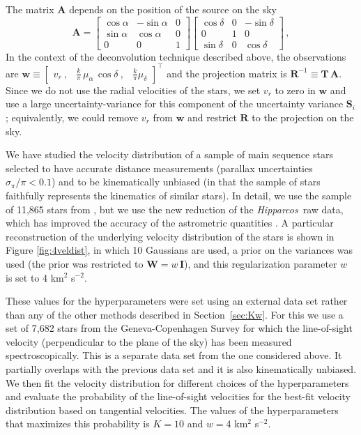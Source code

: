 \documentclass[aoas,preprint,authoryear,round]{imsart}
\newcommand{\Hipparcos}{\emph{Hipparcos}}
\renewcommand{\vec}[1]{\mathbf{#1}} %
\newcommand{\ww}{\vec{w}}
\newcommand{\ten}[1]{\mathbf{#1}} %
\newcommand{\RR}{\ten{R}}
\renewcommand{\SS}{\ten{S}}
\newcommand{\TT}{\ten{T}}
\newcommand{\WW}{\ten{W}}
\newcommand{\II}{\ten{I}}
\newcommand{\SSi}{\SS_i}
\newcommand{\T}{^{\scriptscriptstyle \top}}   %
\newcommand{\matrixleft}{\left[}
\newcommand{\matrixright}{\right]}
\newcommand{\parallax}{\ensuremath{\pi}}
\newcommand{\vrr}{\ensuremath{v_r}}
\newcommand{\ra}{\ensuremath{\alpha}}
\newcommand{\dec}{\ensuremath{\delta}}
\newcommand{\pmra}{\ensuremath{\mu_{\ra}}}
\newcommand{\pmdec}{\ensuremath{\mu_{\dec}}}
\newcommand{\AAA}{\ten{A}}
\begin{document}
The matrix $\AAA$ depends on the position of the source on the sky
\begin{equation}
\AAA = \matrixleft \begin{array}{ccc} \cos \ra & -\sin \ra & 0 \\ \sin \ra & \cos \ra & 0 \\ 0 & 0& 1 \end{array} \matrixright
\matrixleft \begin{array}{ccc} \cos \dec & 0 & -\sin \dec\\ 0 & 1 & 0 \\ \sin \dec  & 0 & \cos\dec\end{array} \matrixright\, ,
\end{equation}
In the context of the deconvolution technique described above, the
observations are $\ww \equiv \matrixleft\begin{array}{ccc} \vrr\ , &
\frac{k}{\parallax}\,\pmra\,\cos\dec\ ,&\frac{k}{\parallax}\pmdec\end{array}
\matrixright\T$ and the projection matrix is $\RR^{-1} \equiv
\TT\,\AAA$. Since we do not use the radial velocities of the stars, we
set $\vrr$ to zero in $\ww$ and use a large uncertainty-variance for
this component of the uncertainty variance $\SSi$; equivalently, we
could remove $\vrr$ from $\ww$ and restrict $\RR$ to the projection on
the sky.

We have studied the velocity distribution of a sample of main sequence
stars selected to have accurate distance measurements (parallax
uncertainties $\sigma_\pi/\pi < 0.1$) and to be kinematically unbiased
(in that the sample of stars faithfully represents the kinematics of
similar stars). In detail, we use the sample of 11,865 stars from
\citet{1998MNRAS.298..387D}, but we use the new reduction of the
\Hipparcos\ raw data, which has improved the accuracy of the
astrometric quantities
\citep{2007A&A...474..653V,2007ASSL..250.....V}. A particular
reconstruction of the underlying velocity distribution of the stars is
shown in Figure \ref{fig:4veldist}, in which 10 Gaussians are used, a
prior on the variances was used (the prior was restricted to $\WW=
w\,\II$), and this regularization parameter $w$ is set to 4 km$^2$
s$^{-2}$.

These values for the hyperparameters were set using an external data
set rather than any of the other methods described in
Section~\ref{sec:Kw}. For this we use a set of 7,682 stars from the
Geneva-Copenhagen Survey
\citep{2004A&A...418..989N,2008arXiv0811.3982H} for which the
line-of-sight velocity (perpendicular to the plane of the sky) has
been measured spectroscopically. This is a separate data set from the
one considered above. It partially overlaps with the previous data set
and it is also kinematically unbiased. We then fit the velocity
distribution for different choices of the hyperparameters and evaluate
the probability of the line-of-sight velocities for the best-fit
velocity distribution based on tangential velocities. The values of
the hyperparameters that maximizes this probability is $K = 10$ and
$w= $4 km$^2$ s$^{-2}$.
\end{document}
